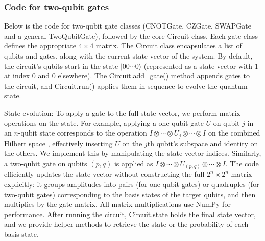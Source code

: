 \documentclass{beamer}
\begin{document}
\begin{frame}
\frametitle{Code for two-qubit gates}

Below is the code for two-qubit gate classes (CNOTGate, CZGate,
SWAPGate and a general TwoQubitGate), followed by the core Circuit
class. Each gate class defines the appropriate $4\times4$ matrix. The
Circuit class encapsulates a list of qubits and gates, along with the
current state vector of the system. By default, the circuit’s qubits
start in the state $|00\cdots0\rangle$ (represented as a state vector
with 1 at index 0 and 0 elsewhere). The Circuit.add_gate() method
appends gates to the circuit, and Circuit.run() applies them in
sequence to evolve the quantum state.

State evolution: To apply a gate to the full state vector, we perform
matrix operations on the state. For example, applying a one-qubit gate
$U$ on qubit $j$ in an $n$-qubit state corresponds to the operation $I
\otimes \cdots \otimes U_j \otimes \cdots \otimes I$ on the combined
Hilbert space , effectively inserting $U$ on the $j$th qubit’s
subspace and identity on the others. We implement this by manipulating
the state vector indices. Similarly, a two-qubit gate on qubits
$(p,q)$ is applied as $I \otimes \cdots \otimes U_{(p,q)} \otimes
\cdots \otimes I$. The code efficiently updates the state vector
without constructing the full $2^n \times 2^n$ matrix explicitly: it
groups amplitudes into pairs (for one-qubit gates) or quadruples (for
two-qubit gates) corresponding to the basis states of the target
qubits, and then multiplies by the gate matrix. All matrix
multiplications use NumPy for performance. After running the circuit,
Circuit.state holds the final state vector, and we provide helper
methods to retrieve the state or the probability of each basis state.
\end{frame}
\end{document}
